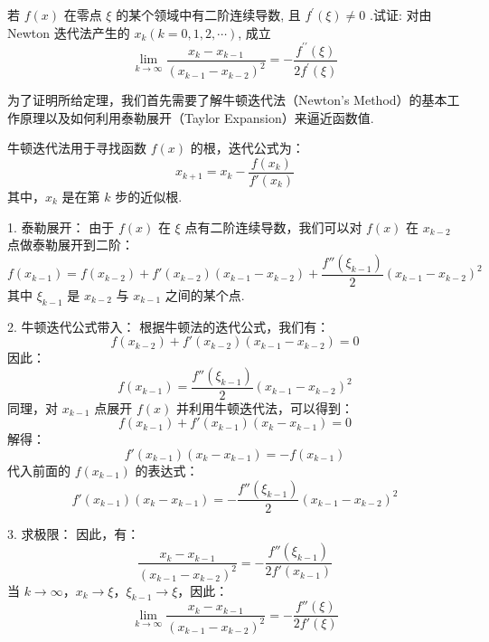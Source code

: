 \begin{tcolorbox}[enhanced,colback=10,colframe=9,breakable,coltitle=green!25!black,title=2024]
  
 若 $ f(x) $ 在零点 $ \xi $ 的某个领域中有二阶连续导数, 且 $ f^{\prime}(\xi) \neq 0 $ .试证: 对由 Newton 迭代法产生的 $ x_{k}(k=0,1,2, \cdots) $, 成立
$$
\lim _{k \rightarrow \infty} \frac{x_{k}-x_{k-1}}{\left(x_{k-1}-x_{k-2}\right)^{2}}=-\frac{f^{\prime \prime}(\xi)}{2 f^{\prime}(\xi)}
$$
\tcblower


为了证明所给定理，我们首先需要了解牛顿迭代法（Newton's Method）的基本工作原理以及如何利用泰勒展开（Taylor Expansion）来逼近函数值.

牛顿迭代法用于寻找函数 $f(x)$ 的根，迭代公式为：
$$
x_{k+1} = x_k - \frac{f(x_k)}{f'(x_k)}
$$
其中，$x_k$ 是在第 $k$ 步的近似根.

1. 泰勒展开：
   由于 $f(x)$ 在 $\xi$ 点有二阶连续导数，我们可以对 $f(x)$ 在 $x_{k-2}$ 点做泰勒展开到二阶：
   $$
   f(x_{k-1}) = f(x_{k-2}) + f'(x_{k-2})(x_{k-1} - x_{k-2}) + \frac{f''(\xi_{k-1})}{2}(x_{k-1} - x_{k-2})^2
   $$
   其中 $\xi_{k-1}$ 是 $x_{k-2}$ 与 $x_{k-1}$ 之间的某个点.

2. 牛顿迭代公式带入：
   根据牛顿法的迭代公式，我们有：
   $$
   f(x_{k-2}) + f'(x_{k-2})(x_{k-1} - x_{k-2}) = 0
   $$
   因此：
   $$
   f(x_{k-1}) = \frac{f''(\xi_{k-1})}{2}(x_{k-1} - x_{k-2})^2
   $$
   同理，对 $x_{k-1}$ 点展开 $f(x)$ 并利用牛顿迭代法，可以得到：
   $$
   f(x_{k-1}) + f'(x_{k-1})(x_k - x_{k-1}) = 0
   $$
   解得：
   $$
   f'(x_{k-1})(x_k - x_{k-1}) = -f(x_{k-1})
   $$
   代入前面的 $f(x_{k-1})$ 的表达式：
   $$
   f'(x_{k-1})(x_k - x_{k-1}) = -\frac{f''(\xi_{k-1})}{2}(x_{k-1} - x_{k-2})^2
   $$

3. 求极限：
   因此，有：
   $$
   \frac{x_k - x_{k-1}}{(x_{k-1} - x_{k-2})^2} = -\frac{f''(\xi_{k-1})}{2f'(x_{k-1})}
   $$
   当 $k \to \infty$，$x_k \to \xi$，$\xi_{k-1} \to \xi$，因此：
   $$
   \lim_{k \to \infty} \frac{x_k - x_{k-1}}{(x_{k-1} - x_{k-2})^2} = -\frac{f''(\xi)}{2f'(\xi)}
   $$



\end{tcolorbox}


